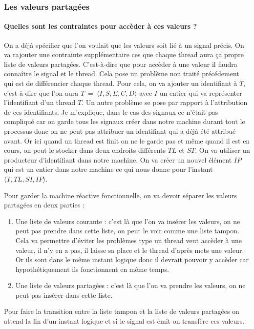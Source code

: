 \documentclass[10pt,a4paper]{article}
\begin{document}
			\subsubsection{Les valeurs partagées}
			
				\paragraph{Quelles sont les contraintes pour accèder à ces valeurs ?}
				On a déjà spécifier que l'on voulait que les valeurs soit lié à un signal précis. On va rajouter une contrainte supplémentaire ces que chaque thread aura ça propre liste de valeurs partagées. C'est-à-dire que pour accèder à une valeur il faudra connaître le signal et le thread. Cela pose un problème non traité précédement qui est de différencier chaque thread. Pour cela, on va ajouter un identifiant à $T$, c'est-à-dire que l'on aura $T~=~\langle I,S,E,C,D\rangle$ avec $I$ un entier qui va représenter l'identifiant d'un thread $T$. Un autre problème se pose par rapport à l'attribution de ces identifiants.
				\smallbreak
				Je m'explique, dans le cas des signaux ce n'était pas compliqué car on garde tous les signaux créer dans notre machine durant tout le processus donc on ne peut pas attribuer un identifiant qui a déjà été attribué avant. Or ici quand un thread est finit on ne le garde pas et même quand il est en cours, on peut le stocker dans deux endroits différents $TL$ et $ST$. On va utiliser un producteur d'identifiant dans notre machine. On va créer un nouvel élément $IP$ qui est un entier dans notre machine ce qui nous donne pour l'instant $\langle T,TL,SI,IP\rangle$.
				\medbreak
				
				Pour garder la machine réactive fonctionnelle, on va devoir séparer les valeurs partagées en deux parties :
				\begin{enumerate}
					\item Une liste de valeurs courante : c'est là que l'on va insérer les valeurs, on ne peut pas prendre dans cette liste, on peut le voir comme une liste tampon. Cela va permettre d'éviter les problèmes type un thread veut accèder à une valeur, il n'y en a pas, il laisse sa place et le thread d'après mets une valeur. Or ils sont dans le même instant logique donc il devrait pouvoir y accèder car hypothétiquement ils fonctionnent en même temps.
					\item Une liste de valeurs partagées : c'est là que l'on va prendre les valeurs, on ne peut pas insèrer dans cette liste.
				\end{enumerate}
				\smallbreak
				Pour faire la transition entre la liste tampon et la liste de valeurs partagées on attend la fin d'un instant logique et si le signal est émit on transfère ces valeurs.
				\medbreak
				
\end{document}
